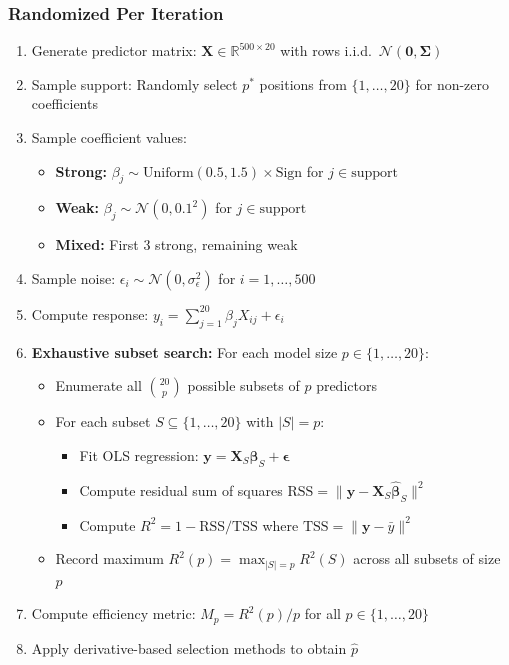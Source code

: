 \documentclass[11pt,a4paper]{article}
\begin{document}
\subsubsection{Randomized Per Iteration}
\begin{enumerate}
\item Generate predictor matrix: $\mathbf{X} \in \mathbb{R}^{500 \times 20}$ with rows i.i.d.\ $\mathcal{N}(\mathbf{0}, \mathbf{\Sigma})$
\item Sample support: Randomly select $p^*$ positions from $\{1,\ldots,20\}$ for non-zero coefficients
\item Sample coefficient values:
\begin{itemize}
\item \textbf{Strong:} $\beta_j \sim \text{Uniform}(0.5, 1.5) \times \text{Sign}$ for $j \in \text{support}$
\item \textbf{Weak:} $\beta_j \sim \mathcal{N}(0, 0.1^2)$ for $j \in \text{support}$
\item \textbf{Mixed:} First 3 strong, remaining weak
\end{itemize}
\item Sample noise: $\epsilon_i \sim \mathcal{N}(0, \sigma_{\epsilon}^2)$ for $i = 1,\ldots,500$
\item Compute response: $y_i = \sum_{j=1}^{20} \beta_j X_{ij} + \epsilon_i$
\item \textbf{Exhaustive subset search:} For each model size $p \in \{1,\ldots,20\}$:
\begin{itemize}
\item Enumerate all $\binom{20}{p}$ possible subsets of $p$ predictors
\item For each subset $S \subseteq \{1,\ldots,20\}$ with $|S| = p$:
\begin{itemize}
\item Fit OLS regression: $\mathbf{y} = \mathbf{X}_S \boldsymbol{\beta}_S + \boldsymbol{\epsilon}$
\item Compute residual sum of squares $\text{RSS} = \|\mathbf{y} - \mathbf{X}_S\hat{\boldsymbol{\beta}}_S\|^2$
\item Compute $R^2 = 1 - \text{RSS}/\text{TSS}$ where $\text{TSS} = \|\mathbf{y} - \bar{y}\|^2$
\end{itemize}
\item Record maximum $R^2(p) = \max_{|S|=p} R^2(S)$ across all subsets of size $p$
\end{itemize}
\item Compute efficiency metric: $M_p = R^2(p)/p$ for all $p \in \{1,\ldots,20\}$
\item Apply derivative-based selection methods to obtain $\hat{p}$
\end{enumerate}
\end{document}
